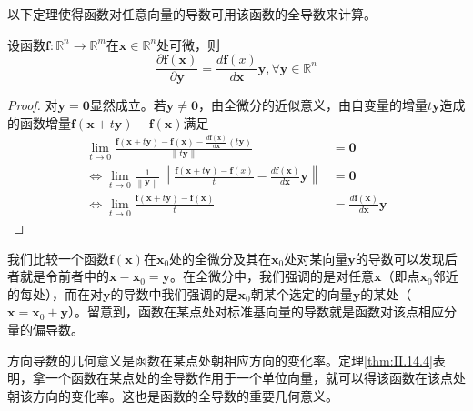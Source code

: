 \documentclass[main.tex]{subfiles}
\begin{document}
以下定理使得函数对任意向量的导数可用该函数的全导数来计算。

\begin{theorem}\label{thm:II.14.4}
设函数$\mathbf{f}:\mathbb{R}^n\rightarrow\mathbb{R}^m$在$\mathbf{x}\in\mathbb{R}^n$处可微，则
\[\frac{\partial\mathbf{f}\left(\mathbf{x}\right)}{\partial\mathbf{y}}=\frac{d\mathbf{f}\left(x\right)}{d\mathbf{x}}\mathbf{y},\forall\mathbf{y}\in\mathbb{R}^n\]
\end{theorem}
\begin{proof}
对$\mathbf{y}=\mathbf{0}$显然成立。若$\mathbf{y}\neq\mathbf{0}$，由全微分的近似意义，由自变量的增量$t\mathbf{y}$造成的函数增量$\mathbf{f}\left(\mathbf{x}+t\mathbf{y}\right)-\mathbf{f}\left(\mathbf{x}\right)$满足
\begin{align*}
\lim_{t\to 0}\frac{\mathbf{f}\left(\mathbf{x}+t\mathbf{y}\right)-\mathbf{f}\left(\mathbf{x}\right)-\frac{d\mathbf{f}\left(\mathbf{x}\right)}{d\mathbf{x}}\left(t\mathbf{y}\right)}{\left\|t\mathbf{y}\right\|}&=\mathbf{0}\\
\Leftrightarrow\lim_{t\to 0}\frac{1}{\left\|\mathbf{y}\right\|}\left\|\frac{\mathbf{f}\left(\mathbf{x}+t\mathbf{y}\right)-\mathbf{f}\left(x\right)}{t}-\frac{d\mathbf{f}\left(\mathbf{x}\right)}{d\mathbf{x}}\mathbf{y}\right\|&=\mathbf{0}\\
\Leftrightarrow\lim_{t\to 0}\frac{\mathbf{f}\left(\mathbf{x}+t\mathbf{y}\right)-\mathbf{f}\left(\mathbf{x}\right)}{t}&=\frac{d\mathbf{f}\left(\mathbf{x}\right)}{d\mathbf{x}}\mathbf{y}
\end{align*}
\end{proof}

我们比较一个函数$\mathbf{f}\left(\mathbf{x}\right)$在$\mathbf{x}_0$处的全微分及其在$\mathbf{x}_0$处对某向量$\mathbf{y}$的导数可以发现后者就是令前者中的$\mathbf{x}-\mathbf{x}_0=\mathbf{y}$。在全微分中，我们强调的是对任意$\mathbf{x}$（即点$\mathbf{x}_0$邻近的每处），而在对$\mathbf{y}$的导数中我们强调的是$\mathbf{x}_0$朝某个选定的向量$\mathbf{y}$的某处（$\mathbf{x}=\mathbf{x}_0+\mathbf{y}$）。留意到，函数在某点处对标准基向量的导数就是函数对该点相应分量的偏导数。

方向导数的几何意义是函数在某点处朝相应方向的变化率。定理\ref{thm:II.14.4}表明，拿一个函数在某点处的全导数作用于一个单位向量，就可以得该函数在该点处朝该方向的变化率。这也是函数的全导数的重要几何意义。
\end{document}
